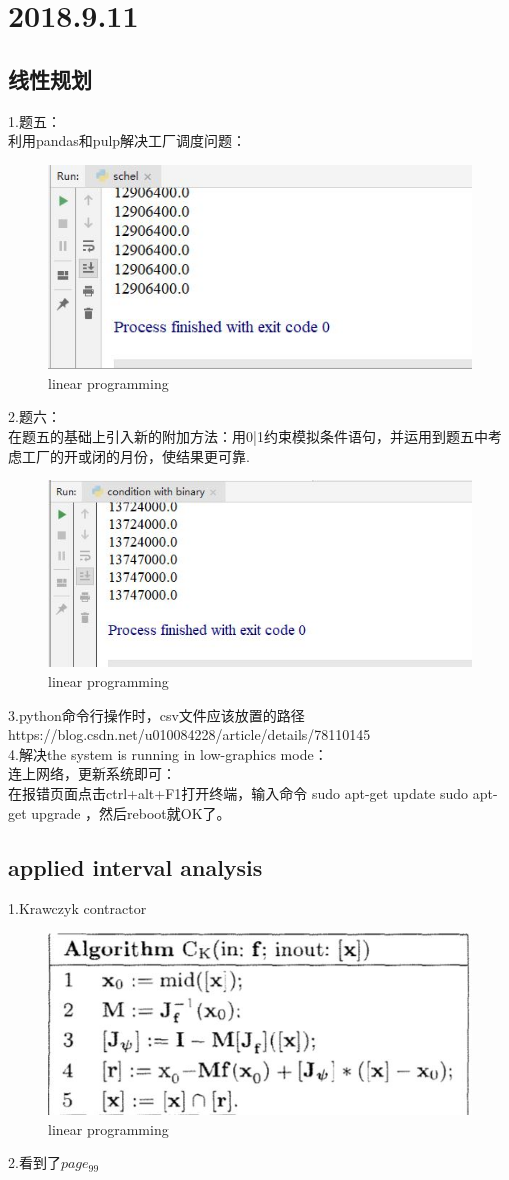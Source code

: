 \documentclass[UTF8]{ctexart}
\begin{document}
\section{2018.9.11}
\subsection{线性规划}
1.题五：\\
利用pandas和pulp解决工厂调度问题：\\
\begin{figure}
  \includegraphics[width=.8\linewidth]{sch.JPG}
  \caption{linear programming}
  \label{fig:boat1}
\end{figure}
2.题六：\\
在题五的基础上引入新的附加方法：用0|1约束模拟条件语句，并运用到题五中考虑工厂的开或闭的月份，使结果更可靠.\\
\begin{figure}
  \includegraphics[width=.8\linewidth]{binary.JPG}
  \caption{linear programming}
  \label{fig:boat1}
\end{figure}
3.python命令行操作时，csv文件应该放置的路径https://blog.csdn.net/u010084228/article/details/78110145\\
4.解决the system is running in low-graphics mode：\\
连上网络，更新系统即可：\\
在报错页面点击ctrl+alt+F1打开终端，输入命令 sudo apt-get update   sudo apt-get upgrade ，然后reboot就OK了。\\
\subsection{applied interval analysis}
1.Krawczyk contractor
\begin{figure}
  \includegraphics[width=.8\linewidth]{kra.JPG}
  \caption{linear programming}
  \label{fig:boat1}
\end{figure}
2.看到了$page_{99}$
\end{document}
